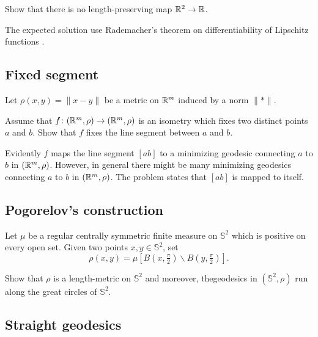 \begin{pr}
Show that there is no length-preserving map $\mathbb{R}^2\to \mathbb{R}$.
\end{pr}


The expected solution use Rademacher's theorem on differentiability of Lipschitz functions \cite[see][]{rademacher}. 



\subsection*{Fixed segment}
\label{Fixed segment}

\begin{pr}
Let $\rho(x,y)=\|x-y\|$ be a metric on $\mathbb{R}^m$ induced by a norm $\|{*}\|$.

Assume that $f\colon(\mathbb{R}^m,\rho)\to(\mathbb{R}^m,\rho)$ is an isometry which fixes two distinct points $a$ and $b$.
Show that $f$ fixes the line segment between $a$ and $b$.
\end{pr}

Evidently $f$ maps the line segment $[ab]$ to a minimizing geodesic connecting $a$ to $b$ in $(\mathbb{R}^m,\rho)$.
However, in general there might be many minimizing geodesics connecting $a$ to $b$ in $(\mathbb{R}^m,\rho)$.
The problem states that $[ab]$ is mapped to itself.


\subsection*{Pogorelov's construction\easy}
\label{Pogorelov's construction}

\begin{pr}
Let $\mu$ be a regular centrally symmetric finite measure on $\mathbb{S}^2$ which is positive on every open set.
Given two points $x,y\in \mathbb{S}^2$,
set 
\[\rho(x,y)=\mu[B(x,\tfrac \pi2)\backslash B(y,\tfrac\pi2)].\]

Show that $\rho$ is a length-metric on $\mathbb{S}^2$
and moreover, thegeodesics in $(\mathbb{S}^2,\rho)$ run along the great circles of $\mathbb{S}^2$.
\end{pr}

\subsection*{Straight geodesics}
\label{Straight geodesics}

